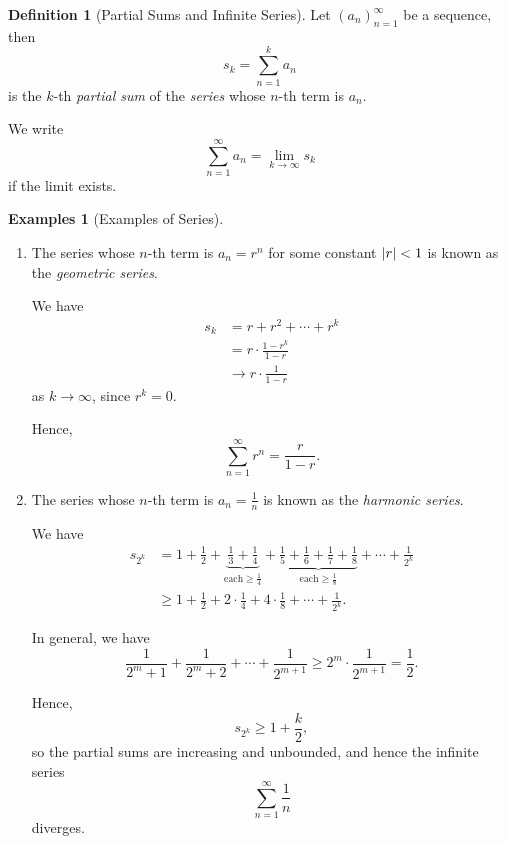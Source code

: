 \documentclass{article}
\theoremstyle{definition}
\newtheorem{definition}[theorem]{Definition}
\newtheorem{examples}[theorem]{Examples}
\theoremstyle{remark}
\DeclarePairedDelimiter{\abs}{\lvert}{\rvert}
\newcommand{\pqty}[1]{\left(#1\right)}
\begin{document}
\begin{definition}[Partial Sums and Infinite Series]
    Let \(\pqty{a_n}_{n = 1}^{\infty}\) be a sequence, then
    \[
        s_k = \sum_{n = 1}^{k} a_n
    \]
    is the \(k\)-th \emph{partial sum} of the \emph{series} whose \(n\)-th term is \(a_n\).

    We write
    \[
        \sum_{n = 1}^{\infty} a_n = \lim_{k \to \infty} s_k
    \]
    if the limit exists.
\end{definition}

\begin{examples}[Examples of Series]
    \begin{enumerate}
        \item The series whose \(n\)-th term is \(a_n = r^n\) for some constant \(\abs{r} < 1\) is known as the \emph{geometric series}.
        
        We have
        \begin{align*}
            s_k &= r + r^2 + \cdots + r^k \\
            &= r \cdot \frac{1 - r^k}{1 - r} \\
            & \to r \cdot \frac{1}{1 - r}
        \end{align*}
        as \(k \to \infty\), since \(r^k = 0\).

        Hence,
        \[
            \sum_{n = 1}^{\infty} r^n = \frac{r}{1 - r}.
        \]

        \item The series whose \(n\)-th term is \(a_n = \frac{1}{n}\) is known as the \emph{harmonic series}.
        
        We have
        \begin{align*}
            s_{2^k} &= 1 + \frac{1}{2} + \underbrace{\frac{1}{3} + \frac{1}{4}}_{\text{each} \geq \frac{1}{4}} + \underbrace{\frac{1}{5} + \frac{1}{6} + \frac{1}{7} + \frac{1}{8}}_{\text{each} \geq \frac{1}{8}} + \cdots + \frac{1}{2^k} \\
            &\geq 1 + \frac{1}{2} + 2 \cdot \frac{1}{4} + 4 \cdot \frac{1}{8} + \cdots + \frac{1}{2^k}.
        \end{align*}

        In general, we have
        \[
            \frac{1}{2^m + 1} + \frac{1}{2^m + 2} + \cdots + \frac{1}{2^{m + 1}} \geq 2^m \cdot \frac{1}{2^{m + 1}} = \frac{1}{2}.
        \]

        Hence,
        \[
            s_{2^k} \geq 1 + \frac{k}{2},
        \]
        so the partial sums are increasing and unbounded, and hence the infinite series
        \[
            \sum_{n = 1}^{\infty} \frac{1}{n}
        \]
        diverges.


\end{enumerate}
\end{examples}
\end{document}

